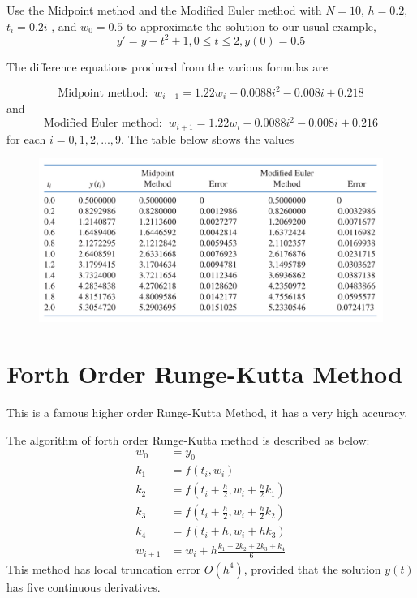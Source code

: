 \begin{ex}
	Use the Midpoint method and the Modified Euler method with $N = 10$, $h = 0.2$, $t_i = 0.2i$ , and $w_0 = 0.5$ to approximate the solution to our usual example,
	\[ y' = y - t^2 + 1, 0 \leq t \leq 2, y(0) = 0.5 \]
	
	\begin{solution}
		The difference equations produced from the various formulas are
		
		\[\text{Midpoint method:}\;\; w_{i+1} = 1.22w_i - 0.0088i^2 - 0.008i + 0.218\]
		and 
		\[\text{Modified Euler method:}\;\; w_{i+1} = 1.22w_i - 0.0088i^2 - 0.008i + 0.216 \]
		for each $i=0,1,2,...,9$. The table below shows the values
		
		\begin{figure} [H]
			\centering
			\includegraphics*[width=\linewidth]{img/chapter8table2.PNG}
		\end{figure}
	\end{solution}
\end{ex}


\section{Forth Order Runge-Kutta Method}
This is a famous higher order Runge-Kutta Method, it has a very high accuracy.  
\begin{thm}
	The algorithm of forth order Runge-Kutta method is described as below:
	\begin{align*}
	w_0 &= y_0\\
	k_1 &= f(t_i, w_i)\\
	k_2 &= f\left(t_i + \frac{h}{2}, w_i + \frac{h}{2}k_1\right)\\
	k_3 &= f\left(t_i + \frac{h}{2}, w_i + \frac{h}{2}k_2\right)\\
	k_4 &= f\left(t_i + h, w_i + hk_3\right)\\
	w_{i+1} &= w_i + h\frac{k_1 + 2k_2 + 2k_3 + k_4}{6}
	\end{align*}
	This method has local truncation error $O(h^4)$, provided that the solution $y(t)$ has five continuous derivatives.
\end{thm}

